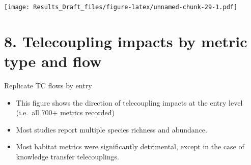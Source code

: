 \documentclass[
]{article}
\newenvironment{Shaded}{\begin{snugshade}}{\end{snugshade}}
\newcommand{\CommentTok}[1]{\textcolor[rgb]{0.56,0.35,0.01}{\textit{#1}}}
\newcommand{\DataTypeTok}[1]{\textcolor[rgb]{0.13,0.29,0.53}{#1}}
\newcommand{\KeywordTok}[1]{\textcolor[rgb]{0.13,0.29,0.53}{\textbf{#1}}}
\newcommand{\NormalTok}[1]{#1}
\newcommand{\OperatorTok}[1]{\textcolor[rgb]{0.81,0.36,0.00}{\textbf{#1}}}
\newcommand{\OtherTok}[1]{\textcolor[rgb]{0.56,0.35,0.01}{#1}}
\newcommand{\StringTok}[1]{\textcolor[rgb]{0.31,0.60,0.02}{#1}}
\providecommand{\tightlist}{%
  \setlength{\itemsep}{0pt}\setlength{\parskip}{0pt}}
\begin{document}
\texttt{[image: Results\_Draft\_files/figure-latex/unnamed-chunk-29-1.pdf]}

\hypertarget{telecoupling-impacts-by-metric-type-and-flow}{%
\section{8. Telecoupling impacts by metric type and
flow}\label{telecoupling-impacts-by-metric-type-and-flow}}

Replicate TC flows by entry

\begin{itemize}
\tightlist
\item
  This figure shows the direction of telecoupling impacts at the entry
  level (i.e.~all 700+ metrics recorded)
\item
  Most studies report multiple species richness and abundance.
\item
  Most habitat metrics were significantly detrimental, except in the
  case of knowledge transfer telecouplings.
\end{itemize}

\begin{Shaded}
\end{Shaded}
\end{document}
